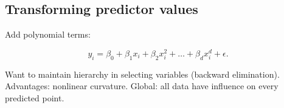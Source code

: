 \subsection{Transforming predictor values}

Add polynomial terms:

\[
y_i = \beta_0 + \beta_1 x_i + \beta_2 x_i^2 + \ldots + \beta_d x_i^d + \epsilon.
\]

Want to maintain hierarchy in selecting variables (backward elimination). Advantages: nonlinear curvature. Global: all data have influence on every predicted point.

 
%
%
%



